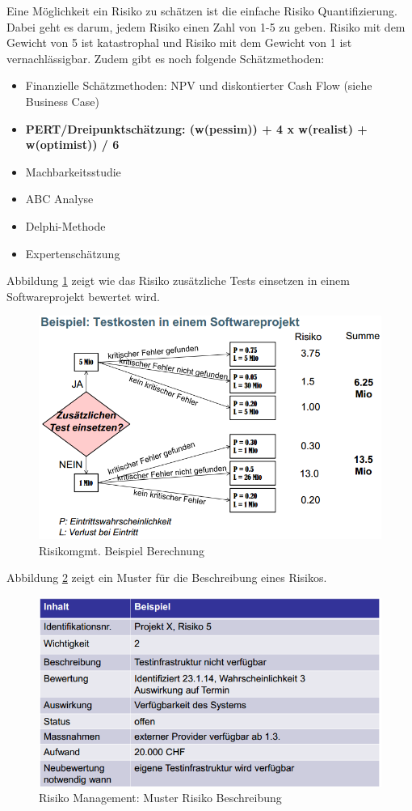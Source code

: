 Eine Möglichkeit ein Risiko zu schätzen ist die einfache Risiko Quantifizierung. Dabei geht es darum, jedem Risiko einen Zahl von 1-5 zu geben. Risiko mit dem Gewicht von 5 ist katastrophal und Risiko mit dem Gewicht von 1 ist vernachlässigbar. Zudem gibt es noch folgende Schätzmethoden:
\begin{itemize}
	\item Finanzielle Schätzmethoden: NPV und diskontierter Cash Flow (siehe Business Case)
	\item \textbf{PERT/Dreipunktschätzung: (w(pessim)) + 4 x w(realist) + w(optimist)) / 6}
	\item Machbarkeitsstudie
	\item ABC Analyse
	\item Delphi-Methode
	\item Expertenschätzung
\end{itemize}
Abbildung \ref{fig:risiko-management-beispiel-berechnung} zeigt wie das Risiko zusätzliche Tests einsetzen in einem Softwareprojekt bewertet wird.
\begin{figure}[h!]
\centering
\includegraphics[width=0.7\linewidth]{fig/risiko-management-beispiel-berechnung}
\caption{Risikomgmt. Beispiel Berechnung}
\label{fig:risiko-management-beispiel-berechnung}
\end{figure}
Abbildung \ref{fig:risiko-management-muster-risiko-beschreibung} zeigt ein Muster für die Beschreibung eines Risikos.
\begin{figure}[h!]
\centering
\includegraphics[width=0.8\linewidth]{fig/risiko-management-muster-risiko-beschreibung}
\caption{Risiko Management: Muster Risiko Beschreibung}
\label{fig:risiko-management-muster-risiko-beschreibung}
\end{figure}

